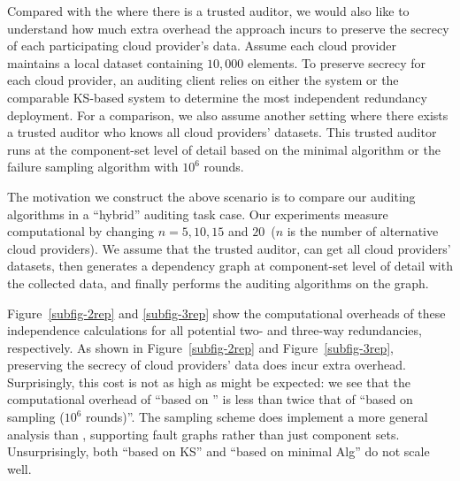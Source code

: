Compared with the \sia where there is a trusted auditor, 
we would also like to understand
how much extra overhead the \pia approach incurs
to preserve the secrecy of each participating cloud provider's data.
Assume each cloud provider maintains a local dataset
containing $10,000$ elements.
To preserve secrecy for each cloud provider, an auditing client
relies on either the \pia system or the comparable KS-based system
to determine the most independent redundancy deployment.
For a comparison, we also assume another setting where
there exists a trusted auditor who knows all cloud providers' datasets.  
This trusted auditor runs
\sia at the component-set level of detail based on
the minimal \rg algorithm or the failure sampling algorithm
with $10^6$ rounds.

The motivation we construct the above scenario is to compare our
auditing algorithms in a ``hybrid'' auditing task case.
Our experiments measure computational
by changing $n=5, 10, 15$ and $20$~($n$ is the number of
alternative cloud providers).
We assume that the trusted auditor,
can get all cloud providers' datasets,
then generates a dependency graph at component-set
level of detail with the collected data,
and finally performs the auditing algorithms on the graph.

Figure~\ref{subfig-2rep} and \ref{subfig-3rep}
show the computational overheads of these independence calculations
for all potential two- and three-way redundancies, respectively.
As shown in Figure~\ref{subfig-2rep} and Figure~\ref{subfig-3rep}, 
preserving the secrecy of cloud providers' data does incur extra overhead.
Surprisingly, this cost is not as high as might be expected:
we see that the computational
overhead of ``\pia based on \pso'' is less than
twice that of ``\sia based on sampling ($10^6$ rounds)''.
The \sia sampling scheme does implement a more general analysis than \pia,
supporting fault graphs rather than just component sets.
Unsurprisingly, both ``\pia based on KS''
and ``\sia based on minimal \rg Alg'' do not scale well.


